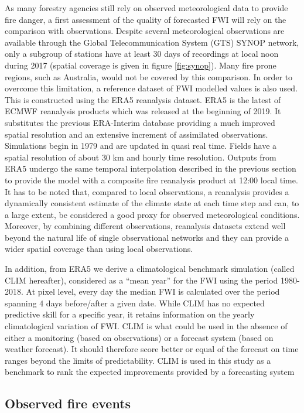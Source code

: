 \documentclass[, manuscript]{copernicus}
\begin{document}
As many forestry agencies still rely on observed meteorological data to
provide fire danger, a first assessment of the quality of forecasted FWI
will rely on the comparison with observations. Despite several
meteorological observations are available through the Global
Telecommunication System (GTS) SYNOP network, only a subgroup of
stations have at least 30 days of recordings at local noon during 2017
(spatial coverage is given in figure \ref{fig:synop}). Many fire prone
regions, such as Australia, would not be covered by this comparison. In
order to overcome this limitation, a reference dataset of FWI modelled
values is also used. This is constructed using the ERA5 reanalysis
dataset. ERA5 is the latest of ECMWF reanalysis products which was
released at the beginning of 2019. It substitutes the previous
ERA-Interim database \citep{dee:11,vitolo:19} providing a much improved
spatial resolution and an extensive increment of assimilated
observations. Simulations begin in 1979 and are updated in quasi real
time. Fields have a spatial resolution of about 30 km and hourly time
resolution. Outputs from ERA5 undergo the same temporal interpolation
described in the previous section to provide the model with a composite
fire reanalysis product at 12:00 local time. It has to be noted that,
compared to local observations, a reanalysis provides a dynamically
consistent estimate of the climate state at each time step and can, to a
large extent, be considered a good proxy for observed meteorological
conditions. Moreover, by combining different observations, reanalysis
datasets extend well beyond the natural life of single observational
networks and they can provide a wider spatial coverage than using local
observations.

In addition, from ERA5 we derive a climatological benchmark simulation
(called CLIM hereafter), considered as a ``mean year'' for the FWI using
the period 1980-2018. At pixel level, every day the median FWI is
calculated over the period spanning 4 days before/after a given date.
While CLIM has no expected predictive skill for a specific year, it
retains information on the yearly climatological variation of FWI. CLIM
is what could be used in the absence of either a monitoring (based on
observations) or a forecast system (based on weather forecast). It
should therefore score better or equal of the forecast on time ranges
beyond the limits of predictability. CLIM is used in this study as a
benchmark to rank the expected improvements provided by a forecasting
system

\subsection{Observed fire events}
\end{document}

